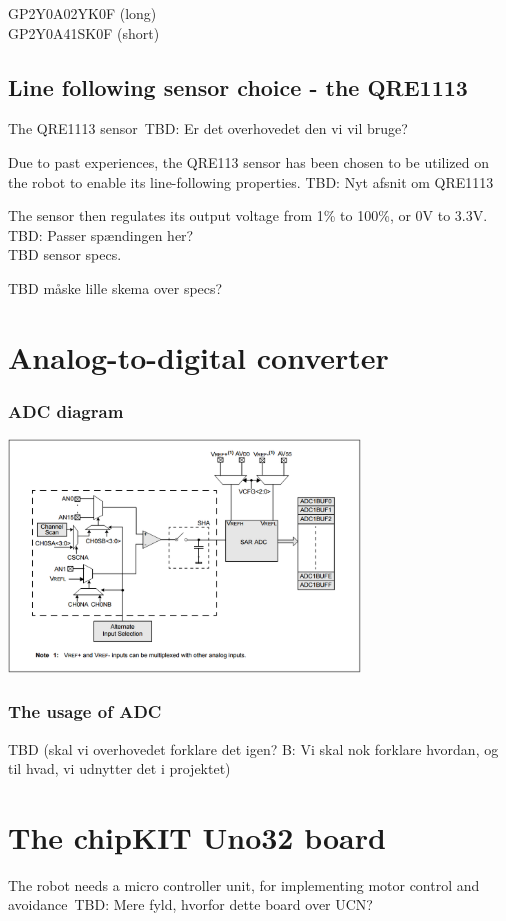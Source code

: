 GP2Y0A02YK0F (long) \\	
GP2Y0A41SK0F (short) \\

\subsection{Line following sensor choice - the QRE1113} 

The QRE1113 sensor\
TBD: Er det overhovedet den vi vil bruge?\

Due to past experiences, the QRE113 sensor has been chosen to be utilized on the robot to enable its line-following properties. TBD: Nyt afsnit om QRE1113

The sensor then regulates its output voltage from 1\% to 100\%, or 0V to 3.3V. TBD: Passer spændingen her?\\

TBD sensor specs.\

TBD måske lille skema over specs?

\section{Analog-to-digital converter}


\subsubsection{ADC diagram} 

\includegraphics[width=0.7\textwidth]{figures/adcblock.PNG}


\subsubsection{The usage of ADC}
TBD (skal vi overhovedet forklare det igen? B: Vi skal nok forklare hvordan, og til hvad, vi udnytter det i projektet)
\section{The chipKIT Uno32 board}
The robot needs a micro controller unit, for implementing motor control and avoidance\
TBD: Mere fyld, hvorfor dette board over UCN?

